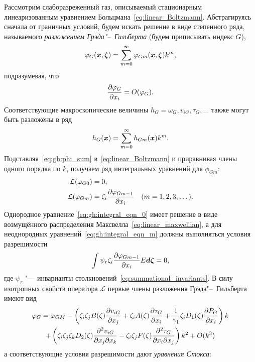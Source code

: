 Рассмотрим слаборазреженный газ, описываемый стационарным линеаризованным уравнением Больцмана~\eqref{eq:linear_Boltzmann}.
Абстрагируясь сначала от граничных условий, будем искать решение в виде степенного ряда,
называемого \emph{разложением Грэда"--~Гильберта} (будем приписывать индекс \(G\)),
\begin{equation}\label{eq:gh:phi_sum}
    \phi_G(\bx,\bzeta) = \sum_{m=0}^\infty \phi_{Gm}(\bx,\bzeta)k^m,
\end{equation}
подразумевая, что
\begin{equation}\label{eq:gh:fluid_assumption}
    \pder[\phi_G]{x_i} = \OO{\phi_G}.
\end{equation}
Соответствующие макроскопические величины \(h_G=\omega_G, v_{iG}, \tau_G,\dots\) также могут быть разложены в ряд
\begin{equation}\label{eq:gh:macro_sum}
    h_G(\bx) = \sum_{m=0}^\infty h_{Gm}(\bx)k^m.
\end{equation}
Подставляя~\eqref{eq:gh:phi_sum} в~\eqref{eq:linear_Boltzmann} и приравнивая члены одного порядка по \(k\),
получаем ряд интегральных уравнений для \(\phi_{Gm}\):
\begin{align}
    \mathcal{L}(\phi_{G0}) &= 0, \label{eq:gh:integral_eqn_0}\\
    \mathcal{L}(\phi_{Gm}) &= \zeta_i\pder[\phi_{Gm-1}]{x_i} \quad (m=1,2,3,\dots). \label{eq:gh:integral_eqn_m}
\end{align}
Однородное уравнение~\eqref{eq:gh:integral_eqn_0} имеет решение
в виде возмущённого распределения Максвелла~\eqref{eq:linear_maxwellian},
а для неоднородных уравнений~\eqref{eq:gh:integral_eqn_m} должны выполняться условия разрешимости
\begin{equation}\label{eq:gh:solvability}
    \int\psi_r\zeta_i\pder[\phi_{Gm-1}]{x_i}E\dzeta = 0,
\end{equation}
где \(\psi_r\) "--- инварианты столкновений~\eqref{eq:summational_invariants}.
В силу изотропных свойств оператора \(\mathcal{L}\) первые члены разложения Грэда"--~Гильберта имеют вид
\begin{multline}\label{eq:gh:phi_explicit}
    \phi_G = \phi_{GM} - \left( \ZZ B(\zeta)\pder[v_{iG}]{x_j}
        + \Z A(\zeta)\pder[\tau_G]{x_i}
        + \frac1{\gamma_1}\Z D_1(\zeta)\pder[P_G]{x_i}
    \right)k \\ + \left( \ZZZ D_2(\zeta)\pderder[v_{iG}]{x_j}{x_k}
        - \ZZ F(\zeta)\pderder[\tau_G]{x_i}{x_j}
    \right)k^2 + \OO{k^3}
\end{multline}
а соответствующие условия разрешимости дают \emph{уравнения Стокса}:
